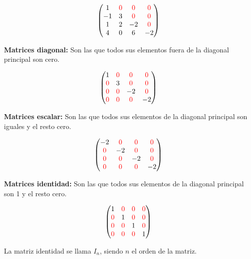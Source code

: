 \[
  \begin{pmatrix}1 & \color{red}0 & \color{red}0 & \color{red}0  \\
  -1 & 3  & \color{red}0 & \color{red}0  \\
  1 & 2 & -2 & \color{red}0 \\
 4 & 0  & 6 & -2  \\ 
\end{pmatrix} \]

\textbf{Matrices diagonal:} Son las que todos sus elementos fuera de la diagonal principal son cero.

\[
  \begin{pmatrix} 1 & \color{red}0 & \color{red}0 & \color{red}0  \\
  \color{red}0 & 3  & \color{red}0 & \color{red}0  \\
  \color{red}0 & \color{red}0 & -2 & \color{red}0 \\
 \color{red}0 & \color{red}0  & \color{red}0 & -2  \\ 
\end{pmatrix}
\] 

 \textbf{Matrices escalar:} Son las que todos sus elementos  de la diagonal principal son iguales y el resto cero.

\[
  \begin{pmatrix} -2 & \color{red}0 & \color{red}0 & \color{red}0  \\
  \color{red}0 & -2  & \color{red}0 & \color{red}0  \\
  \color{red}0 & \color{red}0 & -2 & \color{red}0 \\
 \color{red}0 & \color{red}0  & \color{red}0 & -2  \\ 
\end{pmatrix}
\] 

\textbf{Matrices identidad:} Son las que todos sus elementos  de la diagonal principal son 1 y el resto cero.

\[
  \begin{pmatrix} 1 & \color{red}0 & \color{red}0 & \color{red}0  \\
  \color{red}0 & 1  & \color{red}0 & \color{red}0  \\
  \color{red}0 & \color{red}0 & 1 & \color{red}0 \\
 \color{red}0 & \color{red}0  & \color{red}0 & 1  \\ 
\end{pmatrix}
\] 

La matriz identidad se llama $I_n$, siendo $n$ el orden de la matriz.

